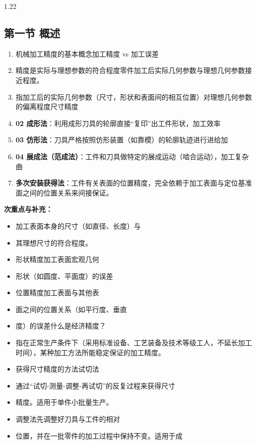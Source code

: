 \documentclass[12pt,a4paper]{article}
\begin{document}
\begin{spacing}{1.22}
\subsection{第一节 概述}
\begin{tcolorbox}[colback=yellow!6,colframe=red!55!black,title=重点,left=1mm,right=1mm]
\begin{enumerate}[leftmargin=2.2em,label=\arabic*.]
  \item 机械加工精度的基本概念加工精度 vs 加工误差
  \item 精度是实际与理想参数的符合程度零件加工后实际几何参数与理想几何参数接近程度。
  \item 指加工后的实际几何参数（尺寸，形状和表面间的相互位置）对理想几何参数的偏离程度尺寸精度
  \item \textbf{02 成形法}：利用成形刀具的轮廓直接“复印”出工件形状，加工效率
  \item \textbf{03 仿形法}：刀具严格按照仿形装置（如靠模）的轮廓轨迹进行进给加
  \item \textbf{04 展成法（范成法）}：工件和刀具做特定的展成运动（啮合运动），加工复杂曲
  \item \textbf{多次安装获得法}：工件有关表面的位置精度，完全依赖于加工表面与定位基准面之间的位置关系来间接保证。
\end{enumerate}
\end{tcolorbox}
\noindent\textbf{次重点与补充：}
\begin{itemize}[leftmargin=2.2em,label=--]
  \item 加工表面本身的尺寸（如直径、长度）与
  \item 其理想尺寸的符合程度。
  \item 形状精度加工表面宏观几何
  \item 形状（如圆度、平面度）的误差
  \item 位置精度加工表面与其他表
  \item 面之间的位置关系（如平行度、垂直
  \item 度）的误差什么是经济精度？
  \item 指在正常生产条件下（采用标准设备、工艺装备及技术等级工人，不延长加工时间），某种加工方法所能稳定保证的加工精度。
  \item 获得尺寸精度的方法试切法
  \item 通过“试切-测量-调整-再试切”的反复过程来获得尺寸
  \item 精度。适用于单件小批量生产。
  \item 调整法先调整好刀具与工件的相对
  \item 位置，并在一批零件的加工过程中保持不变。适用于成

\end{itemize}
\end{spacing}
\end{document}
